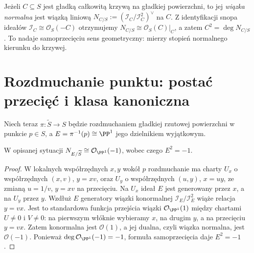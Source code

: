 \begin{definicja}
Jeżeli $C\subseteq S$ jest gładką całkowitą krzywą
na gładkiej powierzchni, to jej \emph{wiązka normalna}
jest wiązką liniową
$N_{C/S}:=(\mathcal I_C/\mathcal I_C^2)^\vee$ na $C$.
Z identyfikacji snopa ideałów $\mathcal I_C\cong\mathcal O_S(-C)$
otrzymujemy $N_{C/S}\cong\mathcal O_S(C)|_C$, a zatem
$C^2=\deg N_{C/S}$. To nadaje samoprzecięciu sens
geometryczny: mierzy stopień normalnego kierunku do krzywej.
\end{definicja}

\section{Rozdmuchanie punktu: postać przecięć i klasa kanoniczna}
\label{sec:ga6-blowup}

Niech teraz $\pi:\widetilde S\to S$ będzie rozdmuchaniem
gładkiej rzutowej powierzchni w punkcie $p\in S$,
a $E=\pi^{-1}(p)\cong\PP^1$ jego dzielnikiem wyjątkowym.

\begin{stwierdzenie}
\label{st:ga6-exceptional-normal}
W opisanej sytuacji $N_{E/\widetilde S}\cong\mathcal O_{\PP^1}(-1)$,
wobec czego $E^2=-1$.
\end{stwierdzenie}
\begin{proof}
W lokalnych współrzędnych $x,y$ wokół $p$ rozdmuchanie
ma charty $U_x$ o współrzędnych $(x,v)$, $y=xv$,
oraz $U_y$ o współrzędnych $(u,y)$, $x=uy$,
ze zmianą $u=1/v$, $y=xv$ na przecięciu.
Na $U_x$ ideał $E$ jest generowany przez $x$,
a na $U_y$ przez $y$. Wzdłuż $E$ generatory
wiązki konormalnej $\mathcal I_E/\mathcal I_E^2$
wiąże relacja $y=vx$. Jest to standardowa funkcja
przejścia wiązki $\mathcal O_{\PP^1}(1)$ między chartami
$U\ne0$ i $V\ne0$: na pierwszym włóknie wybieramy
$x$, na drugim $y$, a na przecięciu $y=vx$.
Zatem konormalna jest $\mathcal O(1)$, a jej dualna,
czyli wiązka normalna, jest $\mathcal O(-1)$.
Ponieważ $\deg\mathcal O_{\PP^1}(-1)=-1$,
formuła samoprzecięcia daje $E^2=-1$.
\end{proof}

